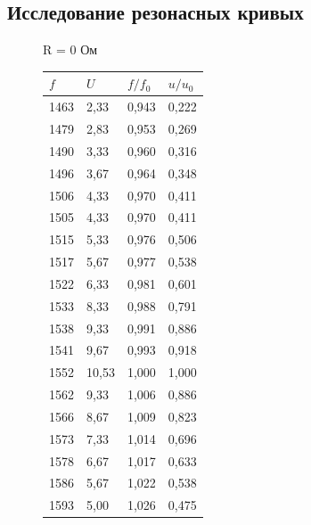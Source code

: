 \documentclass[a4paper,12pt]{article}
\begin{document}
		\subsection{Исследование резонасных кривых}
		
		\begin{figure}[h!]
			\begin{minipage}[h]{0.49\linewidth}
				\centering
				R = 0 Ом

					\begin{tabular}{|l|l|l|l|}
						\hline \hline
						$f$    & $U$     & $f/f_0$ & $u/u_0$ \\ \hline
						1463 & 2,33  & 0,943  & 0,222  \\ \hline
						1479 & 2,83  & 0,953  & 0,269  \\ \hline
						1490 & 3,33  & 0,960  & 0,316  \\ \hline
						1496 & 3,67  & 0,964  & 0,348  \\ \hline
						1506 & 4,33  & 0,970  & 0,411  \\ \hline
						1505 & 4,33  & 0,970  & 0,411  \\ \hline
						1515 & 5,33  & 0,976  & 0,506  \\ \hline
						1517 & 5,67  & 0,977  & 0,538  \\ \hline
						1522 & 6,33  & 0,981  & 0,601  \\ \hline
						1533 & 8,33  & 0,988  & 0,791  \\ \hline
						1538 & 9,33  & 0,991  & 0,886  \\ \hline
						1541 & 9,67  & 0,993  & 0,918  \\ \hline
						1552 & 10,53 & 1,000  & 1,000  \\ \hline
						1562 & 9,33  & 1,006  & 0,886  \\ \hline
						1566 & 8,67  & 1,009  & 0,823  \\ \hline
						1573 & 7,33  & 1,014  & 0,696  \\ \hline
						1578 & 6,67  & 1,017  & 0,633  \\ \hline
						1586 & 5,67  & 1,022  & 0,538  \\ \hline
						1593 & 5,00  & 1,026  & 0,475  \\ \hline\hline
					\end{tabular}
						\newline \newline \newline \newline 	\newline \newline \newline \newline 
			\end{minipage}
			\hfill
			\begin{minipage}[h]{0.49\linewidth}
				

\end{minipage}
\end{figure}
\end{document}
